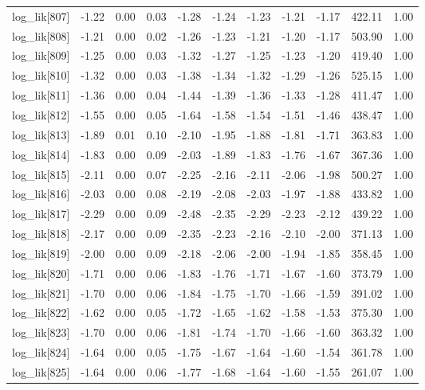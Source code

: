 \begin{table}[ht]
\begin{tabular}{rrrrrrrrrrr}
  log\_lik[807] & -1.22 & 0.00 & 0.03 & -1.28 & -1.24 & -1.23 & -1.21 & -1.17 & 422.11 & 1.00 \\ 
  log\_lik[808] & -1.21 & 0.00 & 0.02 & -1.26 & -1.23 & -1.21 & -1.20 & -1.17 & 503.90 & 1.00 \\ 
  log\_lik[809] & -1.25 & 0.00 & 0.03 & -1.32 & -1.27 & -1.25 & -1.23 & -1.20 & 419.40 & 1.00 \\ 
  log\_lik[810] & -1.32 & 0.00 & 0.03 & -1.38 & -1.34 & -1.32 & -1.29 & -1.26 & 525.15 & 1.00 \\ 
  log\_lik[811] & -1.36 & 0.00 & 0.04 & -1.44 & -1.39 & -1.36 & -1.33 & -1.28 & 411.47 & 1.00 \\ 
  log\_lik[812] & -1.55 & 0.00 & 0.05 & -1.64 & -1.58 & -1.54 & -1.51 & -1.46 & 438.47 & 1.00 \\ 
  log\_lik[813] & -1.89 & 0.01 & 0.10 & -2.10 & -1.95 & -1.88 & -1.81 & -1.71 & 363.83 & 1.00 \\ 
  log\_lik[814] & -1.83 & 0.00 & 0.09 & -2.03 & -1.89 & -1.83 & -1.76 & -1.67 & 367.36 & 1.00 \\ 
  log\_lik[815] & -2.11 & 0.00 & 0.07 & -2.25 & -2.16 & -2.11 & -2.06 & -1.98 & 500.27 & 1.00 \\ 
  log\_lik[816] & -2.03 & 0.00 & 0.08 & -2.19 & -2.08 & -2.03 & -1.97 & -1.88 & 433.82 & 1.00 \\ 
  log\_lik[817] & -2.29 & 0.00 & 0.09 & -2.48 & -2.35 & -2.29 & -2.23 & -2.12 & 439.22 & 1.00 \\ 
  log\_lik[818] & -2.17 & 0.00 & 0.09 & -2.35 & -2.23 & -2.16 & -2.10 & -2.00 & 371.13 & 1.00 \\ 
  log\_lik[819] & -2.00 & 0.00 & 0.09 & -2.18 & -2.06 & -2.00 & -1.94 & -1.85 & 358.45 & 1.00 \\ 
  log\_lik[820] & -1.71 & 0.00 & 0.06 & -1.83 & -1.76 & -1.71 & -1.67 & -1.60 & 373.79 & 1.00 \\ 
  log\_lik[821] & -1.70 & 0.00 & 0.06 & -1.84 & -1.75 & -1.70 & -1.66 & -1.59 & 391.02 & 1.00 \\ 
  log\_lik[822] & -1.62 & 0.00 & 0.05 & -1.72 & -1.65 & -1.62 & -1.58 & -1.53 & 375.30 & 1.00 \\ 
  log\_lik[823] & -1.70 & 0.00 & 0.06 & -1.81 & -1.74 & -1.70 & -1.66 & -1.60 & 363.32 & 1.00 \\ 
  log\_lik[824] & -1.64 & 0.00 & 0.05 & -1.75 & -1.67 & -1.64 & -1.60 & -1.54 & 361.78 & 1.00 \\ 
  log\_lik[825] & -1.64 & 0.00 & 0.06 & -1.77 & -1.68 & -1.64 & -1.60 & -1.55 & 261.07 & 1.00 \\ 

\end{tabular}
\end{table}
